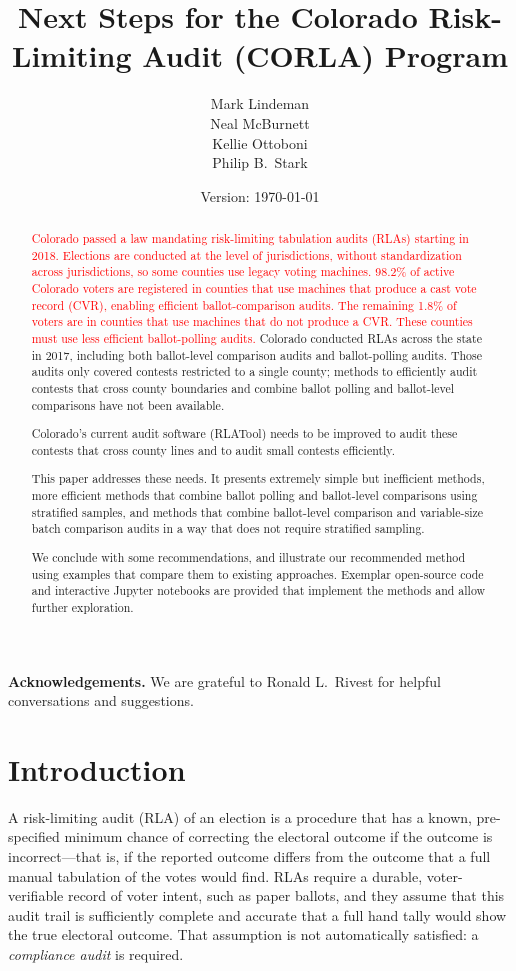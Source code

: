 \documentclass[12pt]{article}
\title{Next Steps for the Colorado Risk-Limiting Audit (CORLA) Program}
\author{
   Mark Lindeman\\
   Neal McBurnett\\
   Kellie Ottoboni\\
   Philip B.~Stark
}
\date{Version: \today}
\newcommand{\note}[1]{\textcolor{red}{\sc #1}}
\begin{document}
\maketitle


\begin{abstract}
\note{Colorado passed a law mandating risk-limiting tabulation audits (RLAs) starting in 2018.
Elections are conducted at the level of jurisdictions, without standardization across jurisdictions,
so some counties use legacy voting machines.
98.2\% of active Colorado voters are registered in counties that use machines that produce a cast vote record (CVR), 
enabling efficient ballot-comparison audits.
The remaining 1.8\% of voters are in counties that use machines that do not produce a CVR.
These counties must use less efficient ballot-polling audits.
}
Colorado conducted RLAs across the state in 2017,
including both ballot-level comparison audits and ballot-polling audits.
Those audits only covered contests restricted to a single county;
methods to efficiently audit contests that cross county boundaries
and combine ballot polling and ballot-level comparisons have not been available.

Colorado's current audit software (RLATool) needs to be improved to audit
these contests that cross county lines and to audit small contests efficiently.

This paper addresses these needs. 
It presents extremely simple but inefficient methods, more efficient methods
that combine ballot polling and ballot-level comparisons using stratified samples,
and methods that combine ballot-level comparison and
variable-size batch comparison audits in a way that does not require stratified
sampling.

We conclude with some recommendations, and illustrate our recommended method
using examples that compare them to existing approaches.
Exemplar open-source code and interactive Jupyter notebooks are provided
that implement the methods and allow further exploration.
\end{abstract}

\noindent
\textbf{Acknowledgements.}
We are grateful to Ronald L.~Rivest for helpful conversations and suggestions.

\section{Introduction}
A risk-limiting audit (RLA) of an election is a procedure that
has a known, pre-specified minimum chance of correcting the electoral outcome if the outcome
is incorrect---that is, if the reported outcome differs from the outcome that a full manual
tabulation of the votes would find. 
RLAs require a durable, voter-verifiable record of voter intent, such as paper ballots,
and they assume that this audit trail is sufficiently complete and accurate that a full hand
tally would show the true electoral outcome.
That assumption is not automatically satisfied: a \emph{compliance audit}
\citep{starkWagner12} 
is required.
\end{document}
